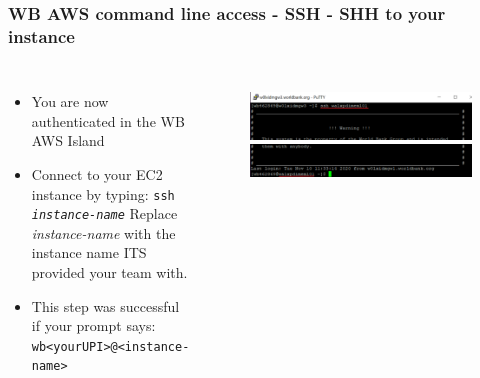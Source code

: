 \documentclass[aspectratio=169]{beamer} %
\begin{document}
\begin{frame}
	\frametitle{WB AWS command line access - SSH - SHH to your instance}
	\begin{columns}[c]
		\begin{itemize}
			\item You are now authenticated in the WB AWS Island
			\item Connect to your EC2 instance by typing: \newline
			\texttt{ssh \textit{instance-name}}\newline
			Replace \textit{instance-name} with the instance name 
			ITS provided your team with.
			\item This step was successful if your prompt says:
			\texttt{wb<yourUPI>@<instance-name>}
		\end{itemize}

		\begin{figure}
			\centering
			\includegraphics[width=\textwidth]{./img/access-3a.png}
			\includegraphics[width=\textwidth]{./img/access-3b.png}
		\end{figure}

	\end{columns}
\end{frame}
\end{document}
